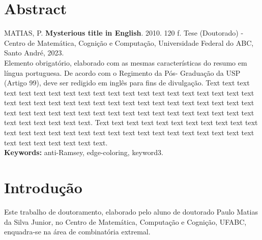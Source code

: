 \documentclass[12pt,a4paper]{book}
\begin{document}
\chapter*{Abstract}
\noindent MATIAS, P. \textbf{Mysterious title in English}. 
2010. 120 f.
Tese (Doutorado) - Centro de Matemática, Cognição e Computação,
Universidade Federal do ABC, Santo André, 2023.
\\


Elemento obrigatório, elaborado com as mesmas características do resumo em
língua portuguesa. De acordo com o Regimento da Pós- Graduação da USP (Artigo
99), deve ser redigido em inglês para fins de divulgação. 
Text text text text text text text text text text text text text text text text
text text text text text text text text text text text text text text text text
text text text text text text text text text text text text text text text text
text text text text text text text text text text text text.
Text text text text text text text text text text text text text text text text
text text text text text text text text text text text text text text text text
text text text.
\\

\noindent \textbf{Keywords:} anti-Ramsey, edge-coloring, keyword3.

\tableofcontents    %

\listoffigures            
 \listoftables            

\mainmatter

\fancyhead[RE,LO]{\thesection}

\onehalfspacing            %




\chapter{Introdução}
\label{sec:intro}

Este trabalho de doutoramento, elaborado pelo aluno de doutorado Paulo Matias da Silva Junior, no Centro de Matemática, Computação e Cognição, UFABC, enquadra-se na área de
combinatória extremal.
\end{document}
